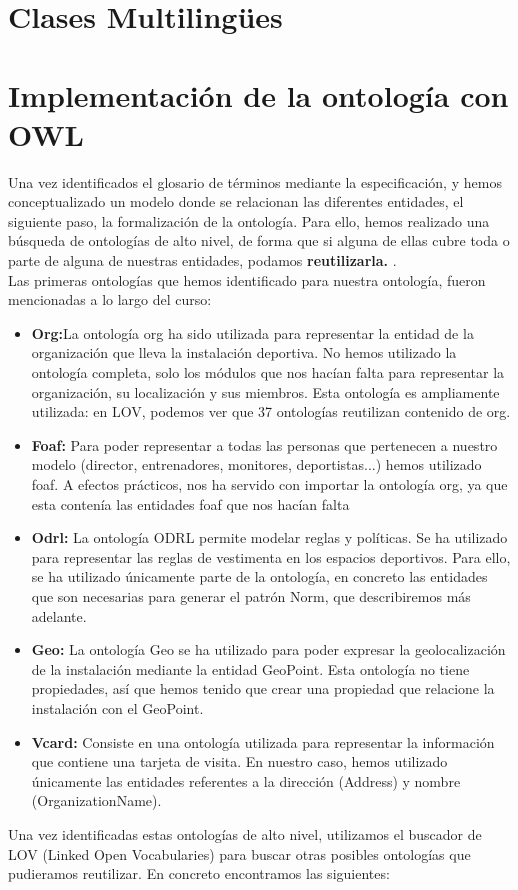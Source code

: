\documentclass[a4paper,12pt]{article}
\begin{document}
	\section{Clases Multilingües}
	
	\section{Implementación de la ontología con OWL}
	
	Una vez identificados el glosario de términos mediante la especificación, y hemos conceptualizado un modelo donde se relacionan las diferentes entidades, el siguiente paso, la formalización de la ontología. Para ello, hemos realizado una búsqueda de ontologías de alto nivel, de forma que si alguna de ellas cubre toda o parte de alguna de nuestras entidades, podamos \textbf{reutilizarla.
	}.\\
	Las primeras ontologías que hemos identificado para nuestra ontología, fueron mencionadas a lo largo del curso:
	\begin{itemize}
		\item \textbf{Org:}La ontología org ha sido utilizada para representar la entidad de la organización que lleva la instalación deportiva. No hemos utilizado la ontología completa, solo los módulos que nos hacían falta para representar la organización, su localización y sus miembros. Esta ontología es ampliamente utilizada: en LOV, podemos ver que 37 ontologías reutilizan contenido de org.
		\item \textbf{Foaf: }Para poder representar a todas las personas que pertenecen a nuestro modelo (director, entrenadores, monitores, deportistas...) hemos utilizado foaf. A efectos prácticos, nos ha servido con importar la ontología org, ya que esta contenía las entidades foaf que nos hacían falta
		\item \textbf{Odrl:} La ontología ODRL permite modelar reglas y políticas. Se ha utilizado para representar las reglas de vestimenta en los espacios deportivos. Para ello, se ha utilizado únicamente parte de la ontología, en concreto las entidades que son necesarias para generar el patrón Norm, que describiremos más adelante.
		\item \textbf{Geo:} La ontología Geo se ha utilizado para poder expresar la geolocalización de la instalación mediante la entidad GeoPoint. Esta ontología no tiene propiedades, así que hemos tenido que crear una propiedad que relacione la instalación con el GeoPoint. 
		\item \textbf{Vcard: }Consiste en una ontología utilizada para representar la información que contiene una tarjeta de visita. En nuestro caso, hemos utilizado únicamente las entidades referentes a la dirección (Address) y nombre (OrganizationName).
		
	\end{itemize}
	Una vez identificadas estas ontologías de alto nivel, utilizamos el buscador de LOV (Linked Open Vocabularies) para buscar otras posibles ontologías que pudieramos reutilizar. En concreto encontramos las siguientes:
	
\end{document}
